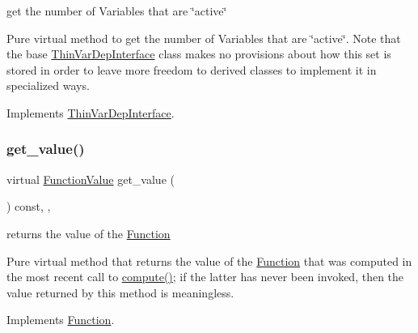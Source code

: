 get the number of Variables that are \char`\"{}active\char`\"{} 

Pure virtual method to get the number of Variables that are \char`\"{}active\char`\"{}. Note that the base \mbox{\hyperlink{class_s_m_spp__di__unipi__it_1_1_thin_var_dep_interface}{Thin\+Var\+Dep\+Interface}} class makes no provisions about how this set is stored in order to leave more freedom to derived classes to implement it in specialized ways. 

Implements \mbox{\hyperlink{group___thin_var_dep_interface___c_l_a_s_s_e_s_ga6dbf09c17736b358d11f617e15856981}{Thin\+Var\+Dep\+Interface}}.

\mbox{\label{class_s_m_spp__di__unipi__it_1_1_linear_function_ae74d8c7f3dc6100820de31198c77ca25}} 
\subsubsection{\texorpdfstring{get\+\_\+value()}{get\_value()}}
{\footnotesize\ttfamily virtual \mbox{\hyperlink{class_s_m_spp__di__unipi__it_1_1_function_a9ad432406b609e28d340f73e9474bffe}{Function\+Value}} get\+\_\+value (\begin{DoxyParamCaption}\item[{void}]{ }\end{DoxyParamCaption}) const\hspace{0.3cm}{\ttfamily [inline]}, {\ttfamily [override]}, {\ttfamily [virtual]}}



returns the value of the \mbox{\hyperlink{class_s_m_spp__di__unipi__it_1_1_function}{Function}} 

Pure virtual method that returns the value of the \mbox{\hyperlink{class_s_m_spp__di__unipi__it_1_1_function}{Function}} that was computed in the most recent call to \mbox{\hyperlink{class_s_m_spp__di__unipi__it_1_1_linear_function_afc8ff54ab05d22f4cca0fb0bfbeb7a49}{compute()}}; if the latter has never been invoked, then the value returned by this method is meaningless. 

Implements \mbox{\hyperlink{class_s_m_spp__di__unipi__it_1_1_function_a040b4850ae0a23a1c9ff79b497b6eaaf}{Function}}.

